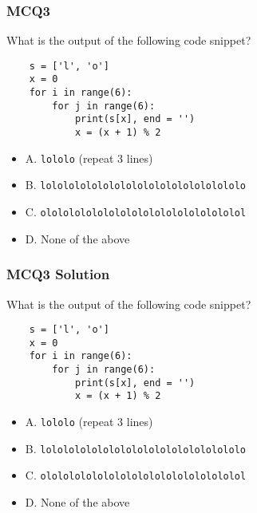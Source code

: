 \documentclass{beamer}
\begin{document}
\begin{frame}[fragile]
    \frametitle{MCQ3}
    What is the output of the following code snippet?
    \begin{verbatim}
    s = ['l', 'o']
    x = 0
    for i in range(6):
        for j in range(6):
            print(s[x], end = '')
            x = (x + 1) % 2
    \end{verbatim}
    \begin{itemize}
        \item A. \texttt{lololo} (repeat 3 lines)
        \item B. \texttt{lolololololololololololololololololo}
        \item C. \texttt{olololololololololololololololololol}
        \item D. None of the above
    \end{itemize}
\end{frame}
\begin{frame}[fragile]
    \frametitle{MCQ3 Solution}
    What is the output of the following code snippet?
    \begin{verbatim}
    s = ['l', 'o']
    x = 0
    for i in range(6):
        for j in range(6):
            print(s[x], end = '')
            x = (x + 1) % 2
    \end{verbatim}
    \begin{itemize}
        \item A. \texttt{lololo} (repeat 3 lines)
        \item \alert{B. \texttt{lolololololololololololololololololo}}
        \item C. \texttt{olololololololololololololololololol}
        \item D. None of the above
    \end{itemize}
\end{frame}
\end{document}
